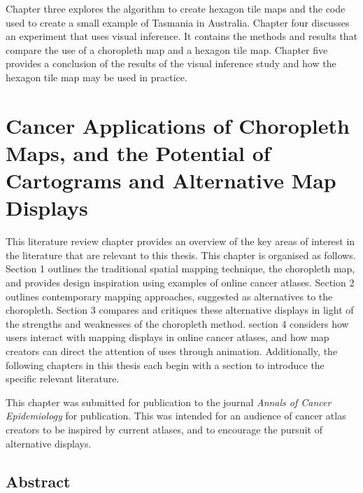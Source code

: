 \documentclass{monashthesis}
\begin{document}
Chapter three explores the algorithm to create hexagon tile maps and the code used to create a small example of Tasmania in Australia.
Chapter four discusses an experiment that uses visual inference. It contains the methods and results that compare the use of a choropleth map and a hexagon tile map.
Chapter five provides a conclusion of the results of the visual inference study and how the hexagon tile map may be used in practice.

\hypertarget{ch:literature}{%
\chapter{Cancer Applications of Choropleth Maps, and the Potential of Cartograms and Alternative Map Displays}\label{ch:literature}}

This literature review chapter provides an overview of the key areas of interest in the literature that are relevant to this thesis. This chapter is organised as follows. Section 1 outlines the traditional spatial mapping technique, the choropleth map, and provides design inspiration using examples of online cancer atlases. Section 2 outlines contemporary mapping approaches, suggested as alternatives to the choropleth. Section 3 compares and critiques these alternative displays in light of the strengths and weaknesses of the choropleth method. section 4 considers how users interact with mapping displays in online cancer atlases, and how map creators can direct the attention of uses through animation. Additionally, the following chapters in this thesis each begin with a section to introduce the specific relevant literature.

This chapter was submitted for publication to the journal \emph{Annals of Cancer Epidemiology} for publication. This was intended for an audience of cancer atlas creators to be inspired by current atlases, and to encourage the pursuit of alternative displays.



\newpage

\hypertarget{abstract-1}{%
\section*{Abstract}\label{abstract-1}}
\end{document}

